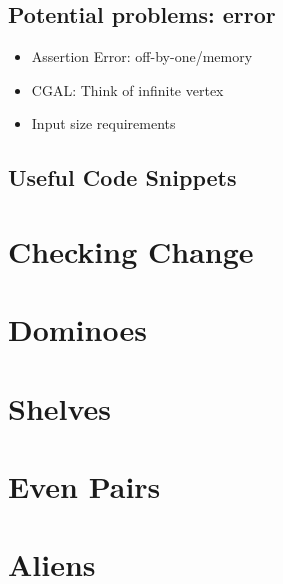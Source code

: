 \documentclass[a4paper, 10pt]{article}
\let\stdsection\section
\renewcommand\section{\newpage\stdsection}
\newcommand{\includecode}[1]{
    }
\newcommand{\algoAuthor}{2} %
\begin{document}
        \subsection*{Potential problems: error}
            \begin{itemize}
                \item Assertion Error: off-by-one/memory
                \item CGAL: Think of infinite vertex
                \item Input size requirements
            \end{itemize}

        \subsection*{Useful Code Snippets}
            \label{sec:misc}
            \includecode{./misc.cpp}


    
    \section{Checking Change}
        \label{sec:checking_change}
        \includecode{../problems/w01/Checking_Change/CheckingChange\algoAuthor.cpp}
    
    \section{Dominoes}
        \label{sec:dominoes}
        \includecode{../problems/w01/Dominoes/Dominoes\algoAuthor.cpp}
    
    \section{Shelves}
        \label{sec:shelves}
        \includecode{../problems/w01/Shelves/Shelves\algoAuthor.cpp}
        
    \section{Even Pairs}
        \label{sec:even_pairs}
        \includecode{../problems/w01/Shelves/Shelves\algoAuthor.cpp}
    
    
    \section{Aliens}
        \label{sec:aliens}
        \includecode{../problems/w02/Aliens/Aliens\algoAuthor.cpp}
        
\end{document}
